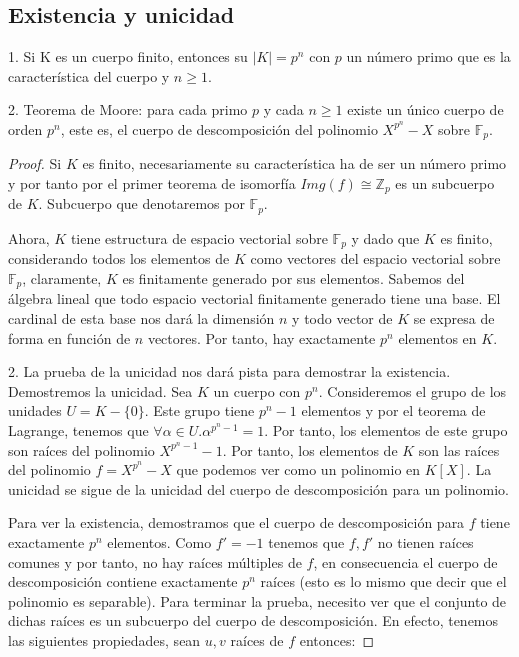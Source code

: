\subsection{Existencia y unicidad}



\begin{theorem}
1. Si K es un cuerpo finito, entonces su $|K| = p^n$ con $p$ un número primo que es la característica del cuerpo y $n \ge 1$. 

2. Teorema de Moore: para cada primo $p$ y cada $n \ge 1$ existe un único cuerpo de orden $p^n$, este es, el cuerpo de descomposición del polinomio $X^{p^n} - X$ sobre $\mathbb{F}_p$. 
\end{theorem}
\begin{proof}
Si $K$ es finito, necesariamente su característica ha de ser un número primo y por tanto por el primer teorema de isomorfía $Img(f) \cong \mathbb{Z}_p$ es un subcuerpo de $K$. Subcuerpo que denotaremos por $\mathbb{F}_p$.

Ahora, $K$ tiene estructura de espacio vectorial sobre $\mathbb{F}_p$ y dado que $K$ es finito, considerando todos los elementos de $K$ como vectores del espacio vectorial sobre $\mathbb{F}_p$, claramente, $K$ es finitamente generado por sus elementos. Sabemos del álgebra lineal que todo espacio vectorial finitamente generado tiene una base. El cardinal de esta base nos dará la dimensión $n$ y todo vector de $K$ se expresa de forma en función de $n$ vectores. Por tanto, hay exactamente $p^n$ elementos en $K$. 

2. La prueba de la unicidad nos dará pista para demostrar la existencia. Demostremos la unicidad. Sea $K$ un cuerpo con $p^n$. Consideremos el grupo de los unidades $U = K-\{0\}$. Este grupo tiene $p^n - 1$ elementos y por el teorema de Lagrange, tenemos que $\forall \alpha \in U. \alpha^{p^n - 1} = 1$. Por tanto, los elementos de este grupo son raíces del polinomio $X^{p^n-1}-1$. Por tanto, los elementos de $K$ son las raíces del polinomio $f = X^{p^n}-X$ que podemos ver como un polinomio en $K[X]$. La unicidad se sigue de la unicidad del cuerpo de descomposición para un polinomio.

Para ver la existencia, demostramos que el cuerpo de descomposición para $f$ tiene exactamente $p^n$ elementos. Como $f' = -1$ tenemos que $f,f'$ no tienen raíces comunes y por tanto, no hay raíces múltiples de $f$, en consecuencia el cuerpo de descomposición contiene exactamente $p^n$ raíces (esto es lo mismo que decir que el polinomio es separable). Para terminar la prueba, necesito ver que el conjunto de dichas raíces es un subcuerpo del cuerpo de descomposición. En efecto, tenemos las siguientes propiedades, sean $u,v$ raíces de $f$ entonces:


\end{proof}
